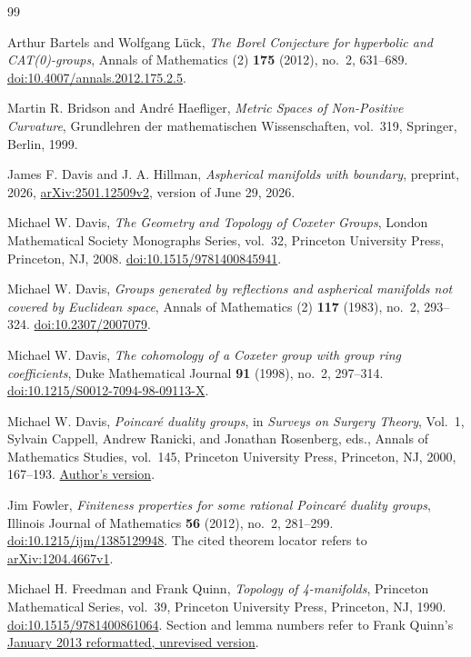 \begin{thebibliography}{99}

Arthur Bartels and Wolfgang L\"uck,
\emph{The Borel Conjecture for hyperbolic and CAT(0)-groups},
Annals of Mathematics (2) \textbf{175} (2012), no.~2, 631--689.
\href{https://doi.org/10.4007/annals.2012.175.2.5}{doi:10.4007/annals.2012.175.2.5}.

Martin R. Bridson and Andr\'e Haefliger,
\emph{Metric Spaces of Non-Positive Curvature},
Grundlehren der mathematischen Wissenschaften, vol.~319,
Springer, Berlin, 1999.

James F. Davis and J. A. Hillman,
\emph{Aspherical manifolds with boundary},
preprint, 2026,
\href{https://arxiv.org/abs/2501.12509v2}{arXiv:2501.12509v2},
version of June 29, 2026.

Michael W. Davis,
\emph{The Geometry and Topology of Coxeter Groups},
London Mathematical Society Monographs Series, vol.~32,
Princeton University Press, Princeton, NJ, 2008.
\href{https://doi.org/10.1515/9781400845941}{doi:10.1515/9781400845941}.

Michael W. Davis,
\emph{Groups generated by reflections and aspherical manifolds not
covered by Euclidean space},
Annals of Mathematics (2) \textbf{117} (1983), no.~2, 293--324.
\href{https://doi.org/10.2307/2007079}{doi:10.2307/2007079}.

Michael W. Davis,
\emph{The cohomology of a Coxeter group with group ring coefficients},
Duke Mathematical Journal \textbf{91} (1998), no.~2, 297--314.
\href{https://doi.org/10.1215/S0012-7094-98-09113-X}{doi:10.1215/S0012-7094-98-09113-X}.

Michael W. Davis,
\emph{Poincar\'e duality groups},
in \emph{Surveys on Surgery Theory}, Vol.~1,
Sylvain Cappell, Andrew Ranicki, and Jonathan Rosenberg, eds.,
Annals of Mathematics Studies, vol.~145,
Princeton University Press, Princeton, NJ, 2000, 167--193.
\href{https://people.math.osu.edu/davis.12/pdgroup.pdf}{Author's version}.

Jim Fowler,
\emph{Finiteness properties for some rational Poincar\'e duality groups},
Illinois Journal of Mathematics \textbf{56} (2012), no.~2, 281--299.
\href{https://doi.org/10.1215/ijm/1385129948}{doi:10.1215/ijm/1385129948}.
The cited theorem locator refers to
\href{https://arxiv.org/abs/1204.4667v1}{arXiv:1204.4667v1}.

Michael H. Freedman and Frank Quinn,
\emph{Topology of 4-manifolds},
Princeton Mathematical Series, vol.~39,
Princeton University Press, Princeton, NJ, 1990.
\href{https://doi.org/10.1515/9781400861064}{doi:10.1515/9781400861064}.
Section and lemma numbers refer to Frank Quinn's
\href{https://archive.mpim-bonn.mpg.de/id/eprint/4789/2/FreedmanQuinn-TopologyOf4Manifolds-Reformatted2013.pdf}{January 2013 reformatted, unrevised version}.


\end{thebibliography}
